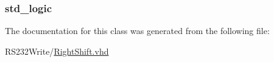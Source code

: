 \subsubsection[{Txp}]{ {\bfseries \textcolor{comment}{std\+\_\+logic}\textcolor{vhdlchar}{ }} \hspace{0.3cm}{\ttfamily [Signal]}}\label{class_right_shft_1_1simple_a7b4bfd6ce4a8352fa0dadba415546d17}


The documentation for this class was generated from the following file\+:\begin{DoxyCompactItemize}
\item 
R\+S232\+Write/\hyperlink{_right_shift_8vhd}{Right\+Shift.\+vhd}\end{DoxyCompactItemize}
